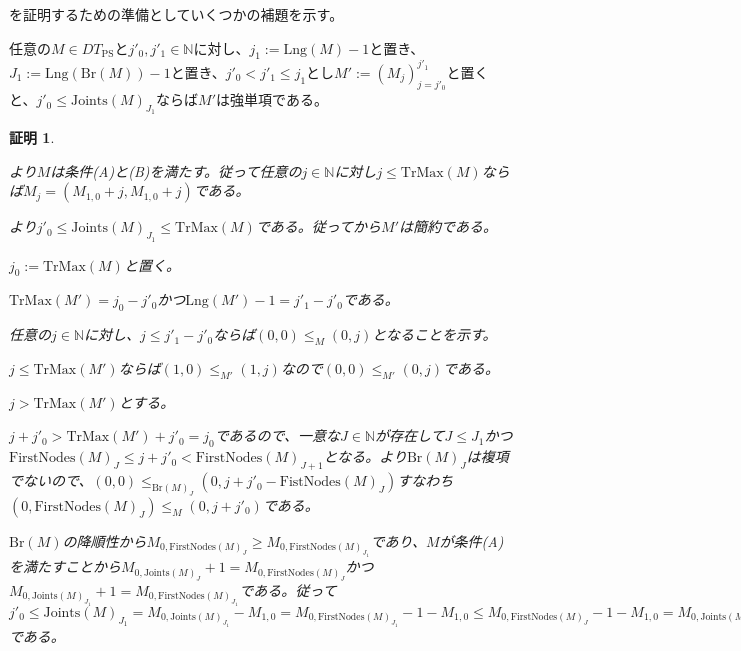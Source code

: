 \documentclass[dvipdfmx,uplatex]{jsarticle}
\theoremstyle{customnonumberbreakfortheorem}
\theoremstyle{customnonumberbreakforproof}
\newtheorem{hideableproof}{証明}
\begin{document}
を証明するための準備としていくつかの補題を示す。

\begin{lemma}[強単項性の切片への遺伝性]\label{強単項性の切片への遺伝性}
	任意の\(M \in DT_{\textrm{PS}}\)と\(j'_0,j'_1 \in \mathbb{N}\)に対し、\(j_1 := \textrm{Lng}(M)-1\)と置き、\(J_1 := \textrm{Lng}(\textrm{Br}(M))-1\)と置き、\(j'_0 < j'_1 \leq j_1\)とし\(M' := (M_j)_{j=j'_0}^{j'_1} \)と置くと、\(j'_0 \leq \textrm{Joints}(M)_{J_1}\)ならば\(M'\)は強単項である。
\end{lemma}

\begin{hideableproof}
	\begin{indented}
		\item {}より\(M\)は条件(A)と(B)を満たす。従って任意の\(j \in \mathbb{N}\)に対し\(j \leq \textrm{TrMax}(M)\)ならば\(M_j = (M_{1,0}+j,M_{1,0}+j)\)である。
		\item {}より\(j'_0 \leq \textrm{Joints}(M)_{J_1} \leq \textrm{TrMax}(M)\)である。従ってから\(M'\)は簡約である。
		\item \(j_0 := \textrm{TrMax}(M)\)と置く。
		\item \(\textrm{TrMax}(M') = j_0-j'_0\)かつ\(\textrm{Lng}(M')-1 = j'_1-j'_0\)である。
		\item 任意の\(j \in \mathbb{N}\)に対し、\(j \leq j'_1-j'_0\)ならば\((0,0) \leq_M (0,j)\)となることを示す。
		\begin{indented}
			\item \(j \leq \textrm{TrMax}(M')\)ならば\((1,0) \leq_{M'} (1,j)\)なので\((0,0) \leq_{M'} (0,j)\)である。
			\item \(j > \textrm{TrMax}(M')\)とする。
			\begin{indented}
				\item \(j+j'_0 > \textrm{TrMax}(M')+j'_0 = j_0\)であるので、一意な\(J \in \mathbb{N}\)が存在して\(J \leq J_1\)かつ\(\textrm{FirstNodes}(M)_J \leq j+j'_0 < \textrm{FirstNodes}(M)_{J+1}\)となる。より\(\textrm{Br}(M)_J\)は複項でないので、\((0,0) \leq_{\textrm{Br}(M)_J} (0,j+j'_0 - \textrm{FistNodes}(M)_J)\)すなわち\((0,\textrm{FirstNodes}(M)_J) \leq_M (0,j+j'_0)\)である。
				\item \(\textrm{Br}(M)\)の降順性から\(M_{0,\textrm{FirstNodes}(M)_J} \geq M_{0,\textrm{FirstNodes}(M)_{J_1}}\)であり、\(M\)が条件(A)を満たすことから\(M_{0,\textrm{Joints}(M)_J}+1 = M_{0,\textrm{FirstNodes}(M)_J}\)かつ\(M_{0,\textrm{Joints}(M)_{J_1}}+1 = M_{0,\textrm{FirstNodes}(M)_{J_1}}\)である。従って\(j'_0 \leq \textrm{Joints}(M)_{J_1} = M_{0,\textrm{Joints}(M)_{J_1}}-M_{1,0} = M_{0,\textrm{FirstNodes}(M)_{J_1}}-1-M_{1,0} \leq M_{0,\textrm{FirstNodes}(M)_J}-1-M_{1,0} = M_{0,\textrm{Joints}(M)_J}-M_{1,0} = \textrm{Joints}(M)_J\)である。

\end{indented}
\end{indented}
\end{indented}
\end{hideableproof}
\end{document}
